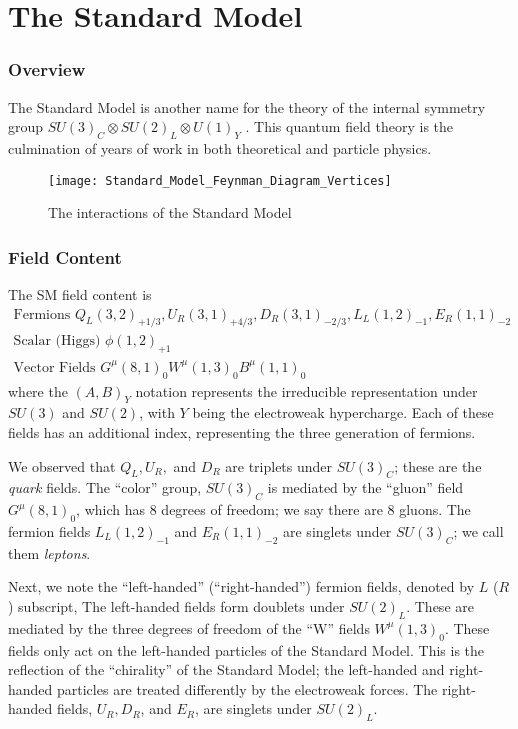 \chapter{The Standard Model}

\subsection{Overview}

The Standard Model is another name for the theory of the internal symmetry group $SU(3)_C \otimes SU(2)_L \otimes U(1)_Y$ .
This quantum field theory is the culmination of years of work in both theoretical and particle physics.  

\begin{figure}
\caption{The interactions of the Standard Model}
\texttt{[image: Standard\_Model\_Feynman\_Diagram\_Vertices]}
\end{figure}

\subsection{Field Content}

The SM field content is
\begin{equation}
\begin{aligned}
\text{Fermions } Q_L(3,2)_{+1/3}, \xspace  U_R(3,1)_{+4/3},\xspace  D_R(3,1)_{-2/3} ,\xspace  L_L(1,2)_{-1} ,\xspace  E_R(1,1)_{-2}\\
\text{Scalar (Higgs) } \xspace \phi(1,2)_{+1} \\
\text{Vector Fields } \xspace G^\mu(8,1)_0 \xspace W^\mu(1,3)_0  \xspace B^\mu(1,1)_0
\end{aligned}
\end{equation}
where the $(A, B)_Y$ notation represents the irreducible representation under $SU(3)$ and $SU(2)$, with $Y$ being the electroweak hypercharge.
Each of these fields has an additional index, representing the three generation of fermions.

We observed that $Q_L, U_R,$ and $D_R$ are triplets under $SU(3)_C$; these are the \textit{quark} fields.
The ``color'' group, $SU(3)_C$ is mediated by the ``gluon'' field $G^\mu(8,1)_0$, which has 8 degrees of freedom; we say there are 8 gluons.
The fermion fields $L_L(1,2)_{-1}$ and $  E_R(1,1)_{-2} $ are singlets under $SU(3)_C$; we call them \textit{leptons}.

Next, we note the ``left-handed'' (``right-handed'') fermion fields, denoted by $L$ ($R$) subscript,
The left-handed fields form doublets under $SU(2)_L$.
These are mediated by the three degrees of freedom of the  ``W'' fields $W^\mu(1,3)_0$.
These fields only act on the left-handed particles of the Standard Model.
This is the reflection of the ``chirality'' of the Standard Model; the left-handed and right-handed particles are treated differently by the electroweak forces.
The right-handed fields, $U_R, D_R$, and $E_R$, are singlets under $SU(2)_L$.

